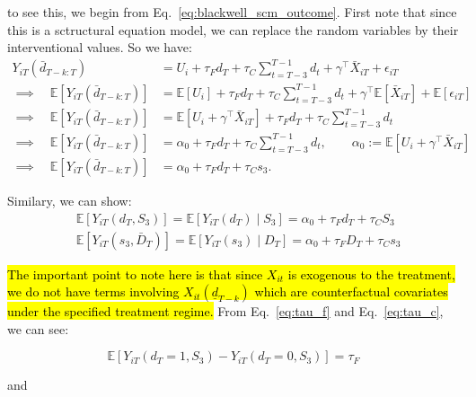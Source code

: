 to see this, we begin from Eq.~\eqref{eq:blackwell_scm_outcome}. First note that since this is 
a sctructural equation model, we can replace the random variables by their interventional values. So we have:
\begin{align}
\label{eq:truemsmproof}
Y_{iT}\!\left(\bar d_{T-k:T}\right)
&= U_i + \tau_F d_T + \tau_C \sum_{t=T-3}^{T-1} d_t + \gamma^\top \bar X_{iT} + \epsilon_{iT} \\
\implies\quad
\mathbb{E}\!\left[Y_{iT}\!\left(\bar d_{T-k:T}\right)\right]
&= \mathbb{E}[U_i] + \tau_F d_T + \tau_C \sum_{t=T-3}^{T-1} d_t
   + \gamma^\top \mathbb{E}[\bar X_{iT}] + \mathbb{E}[\epsilon_{iT}] \\
\implies\quad
\mathbb{E}\!\left[Y_{iT}\!\left(\bar d_{T-k:T}\right)\right]
&= \mathbb{E}\!\left[U_i + \gamma^\top \bar X_{iT}\right]
   + \tau_F d_T + \tau_C \sum_{t=T-3}^{T-1} d_t \\
\implies\quad
\mathbb{E}\!\left[Y_{iT}\!\left(\bar d_{T-k:T}\right)\right]
&= \alpha_0 + \tau_F d_T + \tau_C \sum_{t=T-3}^{T-1} d_t,
\qquad
\alpha_0 := \mathbb{E}\!\left[U_i + \gamma^\top \bar X_{iT}\right]\\
\implies\quad
\mathbb{E}\!\left[Y_{iT}\!\left(\bar d_{T-k:T}\right)\right]
&= \alpha_0 + \tau_F d_T + \tau_C s_3. %
\end{align}

Similary, we can show: 
\begin{align}
\label{eq:tau_f}
&\mathbb{E}\!\left[Y_{iT}\!\left(d_{T},S_3\right)\right]
= \mathbb{E}\!\left[Y_{iT}\!\left(d_{T}\right)\mid S_3\right]
= \alpha_0 + \tau_F d_T + \tau_C S_3 \\
&\mathbb{E}\!\left[Y_{iT}\!\left(s_3,\bar D_T\right)\right]
= \mathbb{E}\!\left[Y_{iT}\!\left(s_{3}\right)\mid D_T\right]
= \alpha_0 + \tau_F D_T + \tau_C s_3
\label{eq:tau_c}
\end{align}

\hl{The important point to note here is that since $X_{it}$ is exogenous to the treatment, we do not have 
terms involving $X_{it}(\underline{d}_{T-k})$ which are counterfactual covariates under 
the specified treatment regime.} From Eq.~\eqref{eq:tau_f} and Eq.~\eqref{eq:tau_c}, we can see: 

\begin{equation}
        \mathbb{E}\left[ Y_{iT}\left(d_T = 1, S_3\right) - Y_{iT}\left(d_T = 0, S_3\right) \right] = \tau_F
\end{equation}


and 

